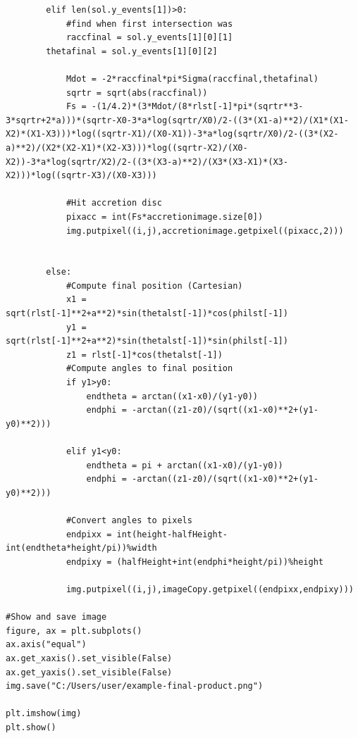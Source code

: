 \documentclass[oneside,openright,frontopenright, singlespacing]{dmathesis}
\begin{document}
\begin{lstlisting}
        elif len(sol.y_events[1])>0:
            #find when first intersection was
            raccfinal = sol.y_events[1][0][1]
	    thetafinal = sol.y_events[1][0][2]
            
            Mdot = -2*raccfinal*pi*Sigma(raccfinal,thetafinal)
            sqrtr = sqrt(abs(raccfinal))
            Fs = -(1/4.2)*(3*Mdot/(8*rlst[-1]*pi*(sqrtr**3-3*sqrtr+2*a)))*(sqrtr-X0-3*a*log(sqrtr/X0)/2-((3*(X1-a)**2)/(X1*(X1-X2)*(X1-X3)))*log((sqrtr-X1)/(X0-X1))-3*a*log(sqrtr/X0)/2-((3*(X2-a)**2)/(X2*(X2-X1)*(X2-X3)))*log((sqrtr-X2)/(X0-X2))-3*a*log(sqrtr/X2)/2-((3*(X3-a)**2)/(X3*(X3-X1)*(X3-X2)))*log((sqrtr-X3)/(X0-X3)))
            
            #Hit accretion disc
            pixacc = int(Fs*accretionimage.size[0])
            img.putpixel((i,j),accretionimage.getpixel((pixacc,2)))
            
            
        else:
            #Compute final position (Cartesian)
            x1 = sqrt(rlst[-1]**2+a**2)*sin(thetalst[-1])*cos(philst[-1])
            y1 = sqrt(rlst[-1]**2+a**2)*sin(thetalst[-1])*sin(philst[-1])
            z1 = rlst[-1]*cos(thetalst[-1])
            #Compute angles to final position
            if y1>y0:
                endtheta = arctan((x1-x0)/(y1-y0))
                endphi = -arctan((z1-z0)/(sqrt((x1-x0)**2+(y1-y0)**2)))
                
            elif y1<y0:
                endtheta = pi + arctan((x1-x0)/(y1-y0))
                endphi = -arctan((z1-z0)/(sqrt((x1-x0)**2+(y1-y0)**2)))
            
            #Convert angles to pixels
            endpixx = int(height-halfHeight-int(endtheta*height/pi))%width
            endpixy = (halfHeight+int(endphi*height/pi))%height

            img.putpixel((i,j),imageCopy.getpixel((endpixx,endpixy)))
            
#Show and save image
figure, ax = plt.subplots()
ax.axis("equal")
ax.get_xaxis().set_visible(False)
ax.get_yaxis().set_visible(False)
img.save("C:/Users/user/example-final-product.png")        

plt.imshow(img)
plt.show()
\end{lstlisting}



{}
\end{document}
